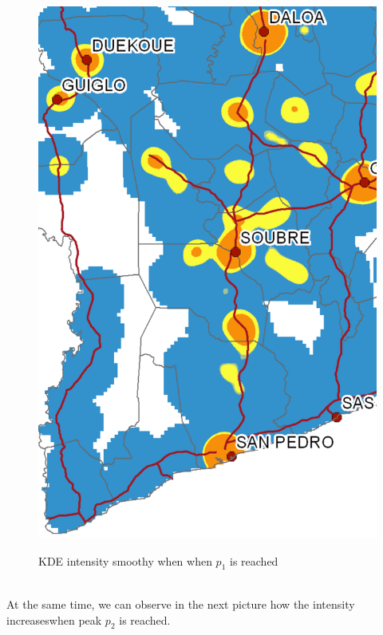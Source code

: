 \begin{figure}
{    \includegraphics[scale = 0.15]{results/images/kernel/l_hour8_kd_detail.pdf}
	\label{fig:subfig2_detail}
}
\caption[KDE intensity dynamic when $p_1$ is reached and central valley starts]{KDE intensity smoothy when when  $p_1$ is reached}
\label{fig:subfigureExample}
\end{figure}


\\

At the same time, we can observe in the next picture how the intensity increaseswhen peak $p_2$ is reached.

\newpage

